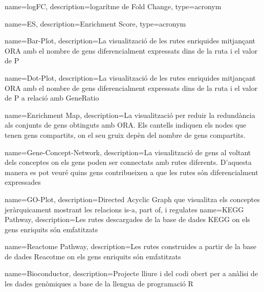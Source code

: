 {
    name={logFC},
    description={logarítme de Fold Change},
type={acronym}
}

{
    name={ES},
    description={Enrichment Score},
   type={acronym}
}

{
    name={Bar-Plot},
    description={La visualització de les rutes enriquides mitjançant ORA amb el nombre de gens diferencialment expressats dins de la ruta i el valor de P}
}

{
    name={Dot-Plot},
    description={La visualització de les rutes enriquides mitjançant ORA amb el nombre de gens diferencialment expressats dins de la ruta i el valor de P a relació amb GeneRatio}
}

{
    name={Enrichment Map},
    description={La visualització per reduir la redundància als conjunts de gens obtinguts amb ORA. Els cantells indiquen els nodes que tenen gens compartits, on el seu gruix depèn del nombre de gens compartits.}
}

{
    name={Gene-Concept-Network},
    description={La visualització de gens al voltant dels conceptes on els gens poden ser connectats amb rutes diferents. D'aquesta manera es pot veuré quins gens contribueixen a que les rutes són diferencialment expressades}
}


{
    name={GO-Plot},
    description={Directed Acyclic Graph que visualitza els conceptes jeràrquicament mostrant les relacions is-a, part of, i regulates}
}
{
    name={KEGG Pathway},
    description={Les rutes descargades de la base de dades KEGG on els gens enriquits són emfatitzats}
}

{
    name={Reactome Pathway},
    description={Les rutes construides a partir de la base de dades Reacotme on els gens enriquits són emfatitzats}
}

{
    name={Bioconductor},
    description={Projecte lliure i del codi obert per a anàlisi de les dades genòmiques a base de la llengua de programació R}
}


\renewcommand*\listfigurename{Llista de les imatges}
\renewcommand{\figurename}{Imatge}
\renewcommand{\contentsname}{Contingut}
\renewcommand*{\acronymname}{Acrònims}
\renewcommand*{\glossaryname}{Glossari}
\renewcommand*{\bibname}{Bibliografia}


